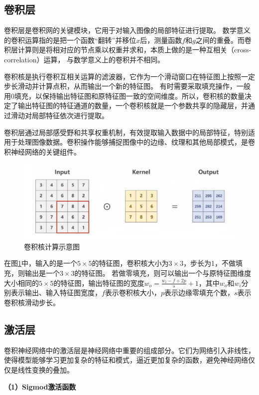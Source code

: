 \subsection{卷积层}
卷积层是卷积网的关键模块，它用于对输入图像的局部特征进行提取。
数学意义的卷积运算指的是把一个函数“翻转”并移位$x$后，测量函数$f$和$g$之间的重叠。而卷积层计算则是将相对应的节点乘以权重并求和，本质上做的是一种互相关（cross-correlation）运算，
与数学意义上的卷积并不相同。

卷积核是执行卷积互相关运算的滤波器，它作为一个滑动窗口在特征图上按照一定步长滑动并计算点积，从而输出一个新的特征图。
有时需要采取填充操作，一般用0填充，以保持输出特征图和原特征图一致的空间维度。所以，卷积核的数量决定了输出特征图的特征通道的数量，一个卷积核就是一个参数共享的隐藏层，并通过滑动对局部特征依次进行提取。

卷积层通过局部感受野和共享权重机制，有效提取输入数据中的局部特征，特别适用于处理图像数据。卷积操作能够捕捉图像中的边缘、纹理和其他局部模式，是卷积神经网络的关键组件。

\begin{figure}[H]
	\includegraphics[width=14cm]{pic/conv-compute.png}
	\caption{卷积核计算示意图}
	\label{conv-compute}
\end{figure}

在图\ref{conv-compute}中，输入的是一个$5\times5$的特征图，卷积核大小为$3\times3$，步长为1，不做填充，则输出是一个$3\times3$的特征图。
若做零填充，则可以输出一个与原特征图维度大小相同的$5\times5$的特征图，输出特征图的宽度$w_o = \frac{w_i-f+2p}{s}+1$，其中$w_o$和$w_i$分别表示输出、输入特征图宽度，$f$表示卷积核大小，$p$表示边缘零填充个数，$s$表示卷积核滑动步长。

\subsection{激活层}
卷积神经网络中的激活层是神经网络中重要的组成部分。它们为网络引入非线性，使得模型能够学习更加复杂的特征和模式，逼近更加复杂的函数，避免神经网络仅仅是线性变换的叠加。

\textbf{（1）Sigmod激活函数}

